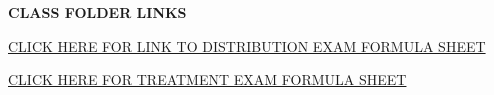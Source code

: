 \documentclass{article}
\begin{document}
%

\textbf{CLASS FOLDER LINKS}

\begin{tcolorbox}[width=17cm,box align=center, halign=center,  valign=center,colback={my-blue},title={}, colbacktitle=yellow,coltitle=blue]    
\href{https://drive.google.com/file/d/1hGnysPD3GTU3sDS5mfSNv0RQzyp658JB/view?usp=sharing}{CLICK HERE FOR LINK TO DISTRIBUTION EXAM FORMULA SHEET}
\end{tcolorbox}

\begin{tcolorbox}[width=17cm,box align=center, halign=center,  valign=center,colback={my-blue},title={}, colbacktitle=yellow,coltitle=blue]    
\href{https://drive.google.com/file/d/1lRYwYbRJnW6Vzmbuvdrygr838N5ZATNn/view?usp=sharing}{CLICK HERE FOR TREATMENT EXAM FORMULA SHEET}
\end{tcolorbox} 
\end{document}
